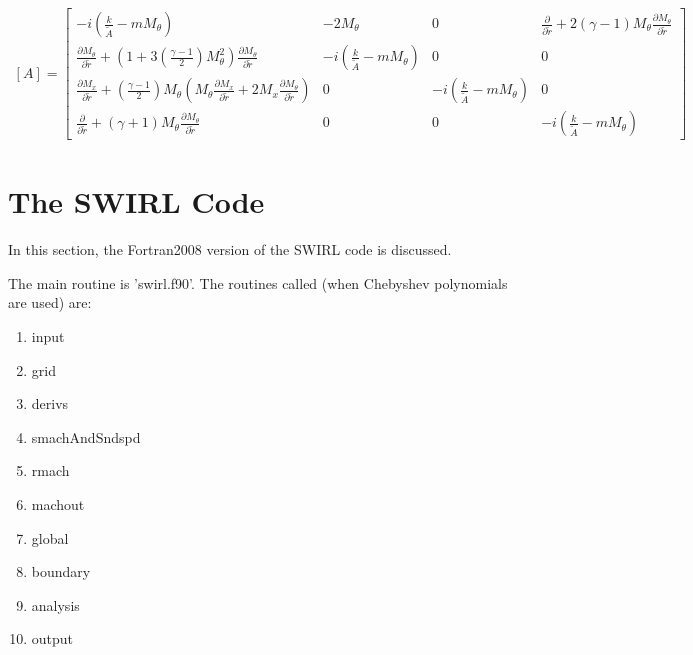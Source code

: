 \documentclass[12pt]{article}
\begin{document}
\begin{tiny}
\begin{eqnarray}
\left[A \right]
=
\left[
\begin{array}{cccc}
-i
\left(
\frac{k}{\widetilde{A}}
- m M_{\theta}
\right) 
&
-2 M_{\theta}
&
0
&
\frac{\partial}{\partial \widetilde{r}}
+ 2 \left(\gamma - 1 \right) M_{\theta}
 \frac{\partial M_{\theta}}{\partial \widetilde{r}}
\\
\frac{\partial M_{\theta} }{\partial \widetilde{r}}
+
\left(1 + 3 \left(\frac{\gamma - 1}{2} \right) M_{\theta}^2 \right)
\frac{\partial M_{\theta} }{\partial \widetilde{r}}
&
-i
\left(
\frac{k}{\widetilde{A}}
- m M_{\theta}
\right) 
&
0
&
0
\\
\frac{\partial M_x }{\partial \widetilde{r}} 
+
\left(\frac{\gamma - 1}{2} \right) M_{\theta} 
\left(
M_{\theta}
\frac{\partial M_x }{\partial \widetilde{r}} 
+2 M_x
\frac{\partial M_{\theta} }{\partial \widetilde{r}} 
\right)
&
0
&
-i
\left(
\frac{k}{\widetilde{A}}
- m M_{\theta}
\right) 
&
0
\\
\frac{\partial}{\partial \widetilde{r}}
+ 
\left(\gamma + 1 \right) M_{\theta}
\frac{\partial M_{\theta} }{\partial \widetilde{r}} 
&
0
&
0
&
-i
\left(
\frac{k}{\widetilde{A}}
- m M_{\theta}
\right) 
\end{array}
\right]
\nonumber
\end{eqnarray}
\end{tiny}%



\section{The SWIRL Code}

In this section, the Fortran2008 version of the SWIRL code is discussed.

The main routine is 'swirl.f90'.  The routines called (when Chebyshev polynomials
are used) are:

\begin{enumerate}
\item{input}
\item{grid}
\item{derivs}
\item{smachAndSndspd}
\item{rmach}
\item{machout}
\item{global}
\item{boundary}
\item{analysis}
\item{output}
\end{enumerate}
\end{document}
